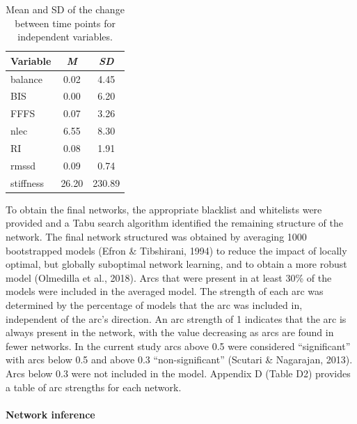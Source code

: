 \documentclass[man,floatsintext]{apa6}
\let\oldparagraph\paragraph
\renewcommand{\paragraph}[1]{\oldparagraph{#1}\mbox{}}
\begin{document}
\begin{table}[H]

\begin{center}
\begin{threeparttable}

\caption{\label{tab:secondnetwork}Mean and SD of the change between time points for independent variables.}

\begin{tabular}{lcc}
\toprule
Variable & \textit{M} & \textit{SD}\\
\midrule
balance & 0.02 & 4.45\\
BIS & 0.00 & 6.20\\
FFFS & 0.07 & 3.26\\
nlec & 6.55 & 8.30\\
RI & 0.08 & 1.91\\
rmssd & 0.09 & 0.74\\
stiffness & 26.20 & 230.89\\
\bottomrule
\end{tabular}

\end{threeparttable}
\end{center}

\end{table}

To obtain the final networks, the appropriate blacklist and whitelists were provided and a Tabu search algorithm identified the remaining structure of the network.
The final network structured was obtained by averaging 1000 bootstrapped models (Efron \& Tibshirani, 1994) to reduce the impact of locally optimal, but globally suboptimal network learning, and to obtain a more robust model (Olmedilla et al., 2018).
Arcs that were present in at least 30\% of the models were included in the averaged model.
The strength of each arc was determined by the percentage of models that the arc was included in, independent of the arc's direction.
An arc strength of 1 indicates that the arc is always present in the network, with the value decreasing as arcs are found in fewer networks.
In the current study arcs above 0.5 were considered \enquote{significant} with arcs below 0.5 and above 0.3 \enquote{non-significant} (Scutari \& Nagarajan, 2013).
Arcs below 0.3 were not included in the model.
Appendix D (Table D2) provides a table of arc strengths for each network.

\hypertarget{network-inference}{%
\paragraph{Network inference}\label{network-inference}}
\end{document}
